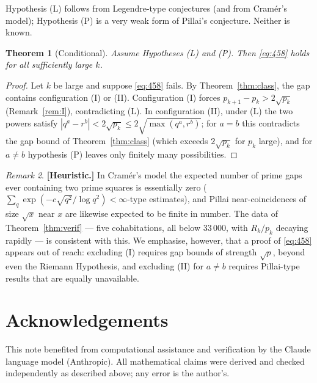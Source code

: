 \documentclass[11pt]{amsart}
\newtheorem{theorem}{Theorem}[section]
\theoremstyle{definition}
\theoremstyle{remark}
\newtheorem{remark}[theorem]{Remark}
\begin{document}
Hypothesis (L) follows from Legendre-type conjectures (and from Cram\'er's model); Hypothesis (P) is a very weak form of Pillai's conjecture. Neither is known.

\begin{theorem}[Conditional]\label{thm:cond}
Assume Hypotheses \textup{(L)} and \textup{(P)}. Then \eqref{eq:458} holds for all sufficiently large $k$.
\end{theorem}

\begin{proof}
Let $k$ be large and suppose \eqref{eq:458} fails. By Theorem~\ref{thm:class}, the gap contains configuration (I) or (II). Configuration (I) forces $p_{k+1}-p_k>2\sqrt{p_k}$ (Remark~\ref{rem:I}), contradicting (L). In configuration (II), under (L) the two powers satisfy $|q^a-r^b|<2\sqrt{p_k}\le 2\sqrt{\max(q^a,r^b)}$; for $a=b$ this contradicts the gap bound of Theorem~\ref{thm:class} (which exceeds $2\sqrt{p_k}$ for $p_k$ large), and for $a\ne b$ hypothesis (P) leaves only finitely many possibilities.
\end{proof}

\begin{remark}\label{rem:heur}
\textbf{[Heuristic.]} In Cram\'er's model the expected number of prime gaps ever containing two prime squares is essentially zero ($\sum_q \exp(-c\sqrt{q^2}/\log q^2)<\infty$-type estimates), and Pillai near-coincidences of size $\sqrt{x}$ near $x$ are likewise expected to be finite in number. The data of Theorem~\ref{thm:verif} --- five cohabitations, all below $33\,000$, with $R_k/p_k$ decaying rapidly --- is consistent with this. We emphasise, however, that a proof of \eqref{eq:458} appears out of reach: excluding (I) requires gap bounds of strength $\sqrt{p}$, beyond even the Riemann Hypothesis, and excluding (II) for $a\ne b$ requires Pillai-type results that are equally unavailable.
\end{remark}

\section*{Acknowledgements}
This note benefited from computational assistance and verification by the Claude language model (Anthropic). All mathematical claims were derived and checked independently as described above; any error is the author's.
\end{document}
